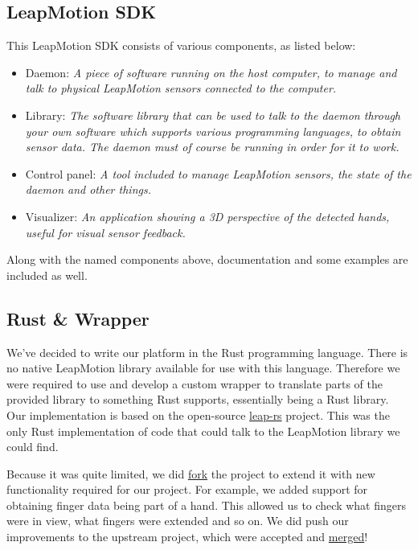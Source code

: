\documentclass{standalone}
\begin{document}
  \subsection{LeapMotion SDK}
  This LeapMotion SDK consists of various components, as listed below:
  \begin{itemize}
    \tightlist{}
    \item Daemon: \textit{%
        A piece of software running on the host computer, to manage and talk
        to physical LeapMotion sensors connected to the computer.
      }
    \item Library: \textit{%
        The software library that can be used to talk to the daemon through
        your own software which supports various programming languages, to
        obtain sensor data. The daemon must of course be running in order for
        it to work.
      }
    \item Control panel: \textit{%
        A tool included to manage LeapMotion sensors, the state of the daemon
        and other things.
      }
    \item Visualizer: \textit{%
        An application showing a 3D perspective of the detected hands, useful
        for visual sensor feedback.
      }
  \end{itemize}
  Along with the named components above, documentation and some examples are
  included as well.

  \subsection{Rust \& Wrapper}
  We've decided to write our platform in the Rust programming language. There is
  no native LeapMotion library available for use with this language. Therefore
  we were required to use and develop a custom wrapper to translate parts of the
  provided library to something Rust supports, essentially being a Rust library.
  Our implementation is based on the open-source
  \href{https://github.com/panicbit/leap-rs}{leap-rs} project. This was the only
  Rust implementation of code that could talk to the LeapMotion library we could
  find.

  Because it was quite limited, we did
  \href{https://github.com/timvisee/leap-rs}{fork}
  the project to extend it with new functionality required for our project.
  For example, we added support for obtaining finger data being part of a hand.
  This allowed us to check what fingers were in view, what fingers were extended
  and so on.
  We did push our improvements to the upstream project, which were accepted and
  \href{https://github.com/panicbit/leap-rs/pulls?utf8=%E2%9C%93&q=is%3Apr+is%3Aclosed+author%3Atimvisee}{merged}!
\end{document}
